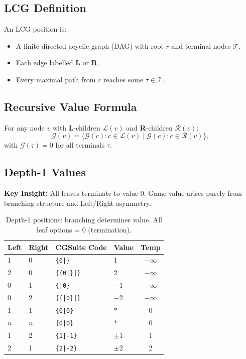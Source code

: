 \documentclass[10pt,a4paper,twocolumn]{article}
\newcommand{\Lopt}[1]{{\color{lblue}\textbf{#1}}}
\newcommand{\Ropt}[1]{{\color{rred}\textbf{#1}}}
\newcommand{\Gv}[1]{\mathcal{G}(#1)}
\theoremstyle{plain}
\theoremstyle{definition}
\theoremstyle{remark}
\begin{document}
\subsection{LCG Definition}

An LCG position is:
\begin{itemize}
\item A finite directed acyclic graph (DAG) with root $r$ and terminal nodes $\mathcal{T}$.
\item Each edge labelled \Lopt{L} or \Ropt{R}.
\item Every maximal path from $r$ reaches some $\tau \in \mathcal{T}$.
\end{itemize}

\subsection{Recursive Value Formula}

For any node $v$ with \Lopt{L}-children $\mathcal{L}(v)$ and \Ropt{R}-children $\mathcal{R}(v)$:
\[
\Gv{v} = \bigl\{ \Gv{c} : c \in \mathcal{L}(v) \;\big|\; \Gv{c} : c \in \mathcal{R}(v) \bigr\},
\]
with $\Gv{\tau} = 0$ for all terminals $\tau$.

\subsection{Depth-1 Values}

\textbf{Key Insight:} All leaves terminate to value 0. Game value arises purely from branching structure and Left/Right asymmetry.

\begin{table}[ht]
\centering
\small
\begin{tabular}{@{}llllc@{}}
\toprule
Left & Right & CGSuite Code & Value & Temp \\
\midrule
1 & 0 & \texttt{\{0|\}} & 1 & $-\infty$ \\
2 & 0 & \texttt{\{\{0|\}|\}} & 2 & $-\infty$ \\
0 & 1 & \texttt{\{|0\}} & $-1$ & $-\infty$ \\
0 & 2 & \texttt{\{\{|0\}|\}} & $-2$ & $-\infty$ \\
1 & 1 & \texttt{\{0|0\}} & $*$ & 0 \\
$n$ & $n$ & \texttt{\{0|0\}} & $*$ & 0 \\
1 & 2 & \texttt{\{1|-1\}} & $\pm 1$ & 1 \\
2 & 1 & \texttt{\{2|-2\}} & $\pm 2$ & 2 \\
\bottomrule
\end{tabular}
\caption{Depth-1 positions: branching determines value. All leaf options = 0 (termination).}
\end{table}
\end{document}

